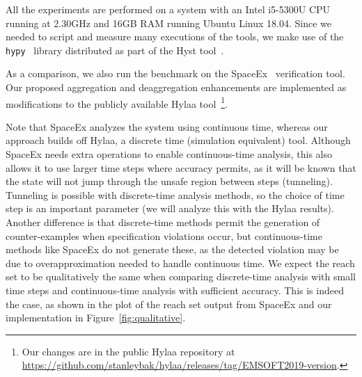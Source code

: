 All the experiments are performed on a system with an Intel i5-5300U CPU running at 2.30GHz and 16GB RAM running Ubuntu Linux 18.04.
%
Since we needed to script and measure many executions of the tools, we make use of the \texttt{hypy}~\cite{hypy} library distributed as part of the
Hyst tool~\cite{bak2015hscc}.

As a comparison, we also run the benchmark on the SpaceEx~\cite{spaceex} verification tool.
%
Our proposed aggregation and deaggregation enhancements are implemented as modifications to the publicly available
Hylaa tool~\cite{bak2017hscc}\footnote{Our changes are in the public Hylaa repository at \url{https://github.com/stanleybak/hylaa/releases/tag/EMSOFT2019-version}.}.

Note that SpaceEx analyzes the system using continuous time, whereas our approach builds off Hylaa, a discrete time (simulation equivalent) tool.
%
Although SpaceEx needs extra operations to enable continuous-time analysis, this also allows it to use larger time steps where accuracy permits, as
it will be known that the state will not jump through the unsafe region between steps (tunneling).
%
Tunneling is possible with discrete-time analysis methods, so the choice of time step is an important parameter (we will analyze this with the Hylaa results).
%
Another difference is that discrete-time methods permit the generation of counter-examples when specification violations occur, but continuous-time methods
like SpaceEx do not generate these, as the detected violation may be due to overapproximation needed to handle continuous time.
%
We expect the reach set to be qualitatively the same when comparing discrete-time analysis with small time steps and continuous-time analysis
with sufficient accuracy.
%
This is indeed the case, as shown in the plot of the reach set output from SpaceEx and our implementation in Figure~\ref{fig:qualitative}.


